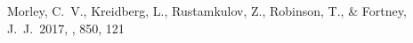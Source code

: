 \documentclass{knac}
\begin{document}
\begin{thebibliography}{}

 Morley, C.~V., Kreidberg, L., Rustamkulov, Z., Robinson, T., \& Fortney, J.~J.\ 2017, \apj, 850, 121

\end{thebibliography}
\end{document}
